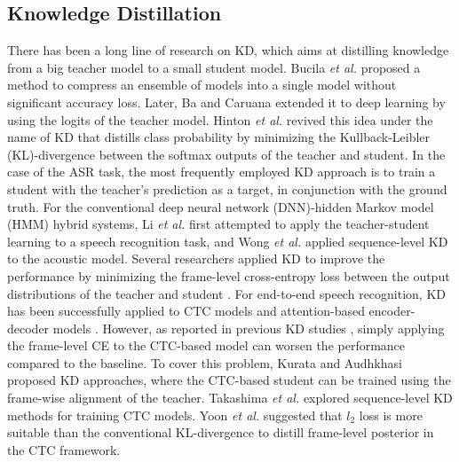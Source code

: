\documentclass[journal]{IEEEtran}
\begin{document}
\subsection{Knowledge Distillation}
\label{2.1}
There has been a long line of research on KD, which aims at distilling knowledge from a big teacher model to a small student model. 
Bucila \textit{et al.} \cite{bucila-et-al:scheme} proposed a method to compress an ensemble of models into a single model without significant accuracy loss.
Later, Ba and Caruana \cite{dodeep:scheme} extended it to deep learning by using the logits of the teacher model.
Hinton \textit{et al.} \cite{hinton_kd-et-al:scheme} revived this idea under the name of KD that distills class probability by minimizing the Kullback-Leibler (KL)-divergence between the softmax outputs of the teacher and student.
In the case of the ASR task, the most frequently employed KD approach is to train a student with the teacher's prediction as a target, in conjunction with the ground truth.
For the conventional deep neural network (DNN)-hidden Markov model (HMM) hybrid systems, Li \textit{et al.} \cite{firstasr:scheme} first attempted to apply the teacher-student learning to a speech recognition task, and Wong \textit{et al.} \cite{seq:scheme} applied sequence-level KD to the acoustic model. Several researchers applied KD to improve the performance by minimizing the frame-level cross-entropy loss between the output distributions of the teacher and student \cite{blending:scheme,chebotar-et-al:scheme,watanabe-et-al:scheme,lu-et-al:scheme,fukuda-et-al:scheme}.
For end-to-end speech recognition, KD has been successfully applied to CTC models \cite{senior-et-al:scheme,takashima-et-al:scheme, takashima-et-al2:scheme, kurata2-et-al:scheme,kurata-et-al:scheme, tutornet:scheme} and attention-based encoder-decoder models \cite{compression:scheme, wer_error:scheme, entropy:scheme, tutornet:scheme}.
However, as reported in previous KD studies \cite{senior-et-al:scheme,takashima-et-al:scheme, takashima-et-al2:scheme, tutornet:scheme}, simply applying the frame-level CE to the CTC-based model can worsen the performance compared to the baseline.
To cover this problem, Kurata and Audhkhasi \cite{kurata-et-al:scheme, kurata2-et-al:scheme} proposed KD approaches, where the CTC-based student can be trained using the frame-wise alignment of the teacher.
Takashima \textit{et al.} \cite{takashima-et-al:scheme,takashima-et-al2:scheme} explored sequence-level KD methods for training CTC models.
Yoon \textit{et al.} \cite{tutornet:scheme} suggested that $l_{2}$ loss is more suitable than the conventional KL-divergence to distill frame-level posterior in the CTC framework.
\end{document}
